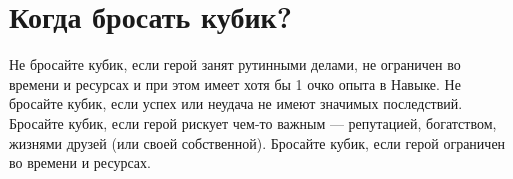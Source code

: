 \section{Когда бросать кубик?}
Не бросайте кубик, если герой занят рутинными делами, не ограничен во времени и ресурсах и при этом имеет хотя бы 1 очко опыта в Навыке. Не бросайте кубик, если успех или неудача не имеют значимых последствий. Бросайте кубик, если герой рискует чем-то важным — репутацией, богатством, жизнями друзей (или своей собственной). Бросайте кубик, если герой ограничен во времени и ресурсах.